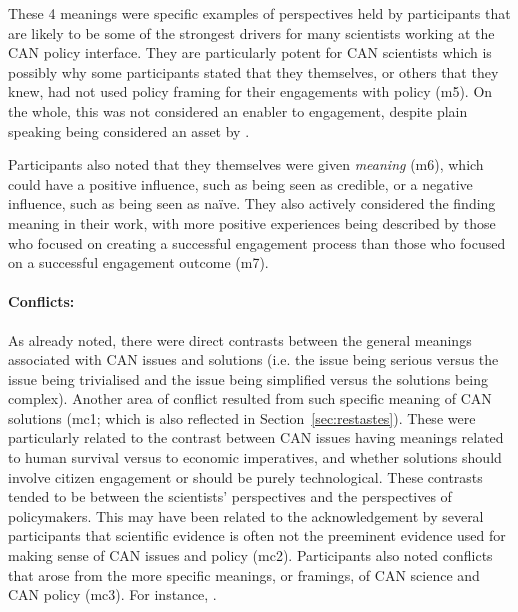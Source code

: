 These 4 meanings were specific examples of perspectives held by participants that are likely to be some of the strongest drivers for many scientists working at the CAN policy interface. They are particularly potent for CAN scientists which is possibly why some participants stated that they themselves, or others that they knew, had not used policy framing for their engagements with policy (m5). On the whole, this was not considered an enabler to engagement, despite plain speaking being considered an asset by . 

Participants also noted that they themselves were given \emph{meaning} (m6), which could have a positive influence, such as being seen as credible, or a negative influence, such as being seen as na\"ive. They also actively considered the finding meaning in their work, with more positive experiences being described by those who focused on creating a successful engagement process than those who focused on a successful engagement outcome (m7).

\paragraph{Conflicts:}
As already noted, there were direct contrasts between the general meanings associated with CAN issues and solutions (i.e. the issue being serious versus the issue being trivialised and the issue being simplified versus the solutions being complex). Another area of conflict resulted from such specific meaning of CAN solutions (mc1; which is also reflected in Section~\ref{sec:restastes}). These were particularly related to the contrast between CAN issues having meanings related to human survival versus to economic imperatives, and whether solutions should involve citizen engagement or should be purely technological. These contrasts tended to be between the scientists' perspectives and the perspectives of policymakers. This may have been related to the acknowledgement by several participants that scientific evidence is often not the preeminent evidence used for making sense of CAN issues and policy (mc2). Participants also noted conflicts that arose from the more specific meanings, or framings, of CAN science and CAN policy (mc3). For instance, . 




